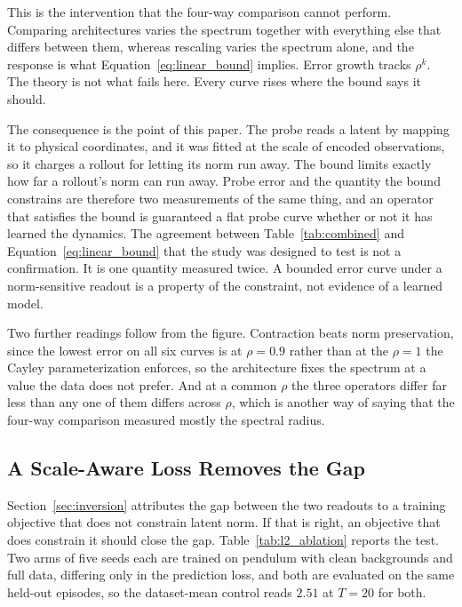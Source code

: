 \documentclass[10pt]{article} %
\begin{document}
This is the intervention that the four-way comparison cannot perform. Comparing architectures varies the spectrum together with everything else that differs between them, whereas rescaling varies the spectrum alone, and the response is what Equation~\ref{eq:linear_bound} implies. Error growth tracks $\rho^k$. The theory is not what fails here. Every curve rises where the bound says it should.

The consequence is the point of this paper. The probe reads a latent by mapping it to physical coordinates, and it was fitted at the scale of encoded observations, so it charges a rollout for letting its norm run away. The bound limits exactly how far a rollout's norm can run away. Probe error and the quantity the bound constrains are therefore two measurements of the same thing, and an operator that satisfies the bound is guaranteed a flat probe curve whether or not it has learned the dynamics. The agreement between Table~\ref{tab:combined} and Equation~\ref{eq:linear_bound} that the study was designed to test is not a confirmation. It is one quantity measured twice. A bounded error curve under a norm-sensitive readout is a property of the constraint, not evidence of a learned model.

Two further readings follow from the figure. Contraction beats norm preservation, since the lowest error on all six curves is at $\rho = 0.9$ rather than at the $\rho = 1$ the Cayley parameterization enforces, so the architecture fixes the spectrum at a value the data does not prefer. And at a common $\rho$ the three operators differ far less than any one of them differs across $\rho$, which is another way of saying that the four-way comparison measured mostly the spectral radius.

\subsection{A Scale-Aware Loss Removes the Gap}
\label{sec:loss}

Section~\ref{sec:inversion} attributes the gap between the two readouts to a training objective that does not constrain latent norm. If that is right, an objective that does constrain it should close the gap. Table~\ref{tab:l2_ablation} reports the test. Two arms of five seeds each are trained on pendulum with clean backgrounds and full data, differing only in the prediction loss, and both are evaluated on the same held-out episodes, so the dataset-mean control reads $2.51$ at $T{=}20$ for both.
\end{document}
